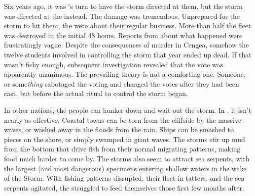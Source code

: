 \documentclass[blue]{GL2020}
\begin{document}
Six years ago, it was \pTech{}'s turn to have the storm directed at them, but the storm was directed at the \pShip{} instead. The damage was tremendous. Unprepared for the storm to hit them, the \pShippies{} were about their regular business. More than half the fleet was destroyed in the initial 48 hours. Reports from \pSchool{} about what happened were frustratingly vague. Despite the consequences of murder in Cengea, somehow the twelve students involved in controlling the storm that year ended up dead. If that wasn't fishy enough, subsequent investigation revealed that the vote was apparently unanimous. The prevailing theory is not a comforting one. Someone, or some\emph{thing} sabotaged the voting and changed the votes after they had been cast, but before the actual ritual to control the storm began.

In other nations, the people can hunker down and wait out the storm. In \pShip{}, it isn't nearly as effective. Coastal towns can be torn from the cliffside by the massive waves, or washed away in the floods from the rain. Ships can be smashed to pieces on the shore, or simply swamped in giant waves. The storms stir up mud from the bottom that drive fish from their normal migrating patterns, making food much harder to come by. The storms also seem to attract sea serpents, with the largest (and most dangerous) specimens entering shallow waters in the wake of the Storm. With fishing patterns disrupted, their fleet in tatters, and the sea serpents agitated, the \pShip{} struggled to feed themselves those first few months after.


\end{document}
